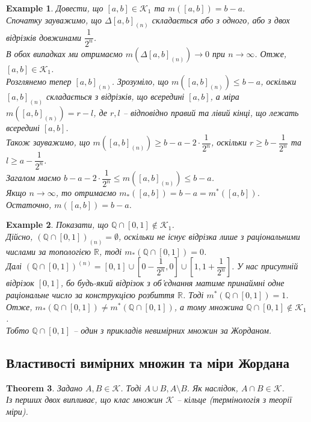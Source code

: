 \documentclass[a4paper, 10pt]{article}
\theoremstyle{theoremdd}
\newtheorem{theorem}{Theorem}[subsection]
\theoremstyle{theoremdd}
\theoremstyle{theoremdd}
\theoremstyle{theoremdd}
\theoremstyle{theoremdd}
\newtheorem{example}[theorem]{Example}
\theoremstyle{theoremdd}
\theoremstyle{theoremdd}
\theoremstyle{theoremdd}
\theoremstyle{theoremdd}
\theoremstyle{theoremdd}
\theoremstyle{theoremdd}
\theoremstyle{theoremdd}
\theoremstyle{theoremdd}
\theoremstyle{theoremdd}
\theoremstyle{theoremdd}
\begin{document}
\begin{example}
Довести, що $[a,b] \in \mathcal{K}_1$ та $m([a,b]) = b-a$.\\
Спочатку зауважимо, що $\Delta [a,b]_{(n)}$ складається або з одного, або з двох відрізків довжинами $\dfrac{1}{2^n}$.\\
В обох випадках ми отримаємо $m(\Delta [a,b]_{(n)}) \to 0$ при $n \to \infty$. Отже, $[a,b] \in \mathcal{K}_1$.\\
Розглянемо тепер $[a,b]_{(n)}$. Зрозуміло, що $m([a,b]_{(n)}) \leq b-a$, оскільки $[a,b]_{(n)}$ складається з відрізків, що всередині $[a,b]$, а міра $m([a,b]_{(n)}) = r - l$, де $r,l$ -- відповідно правий та лівий кінці, що лежать всередині $[a,b]$.\\
Також зауважимо, що $m([a,b]_{(n)}) \geq b-a -2 \cdot \dfrac{1}{2^n}$, оскільки $r \geq b- \dfrac{1}{2^n}$ та $l \geq a- \dfrac{1}{2^n}$.\\
Загалом маємо $b-a- 2 \cdot \dfrac{1}{2^n} \leq m([a,b]_{(n)}) \leq b-a$.\\
Якщо $n \to \infty$, то отримаємо $m_*([a,b]) = b-a = m^*([a,b])$.\\
Остаточно, $m([a,b]) = b-a$.
\end{example}

\begin{example}
Показати, що $\mathbb{Q} \cap [0,1] \not\in \mathcal{K}_1$.\\
Дійсно, $\left(\mathbb{Q} \cap [0,1] \right)_{(n)} = \emptyset$, оскільки не існує відрізка лише з раціональними числами за топологією $\mathbb{R}$, тоді $m_*(\mathbb{Q} \cap [0,1]) = 0$.\\
Далі $\left( \mathbb{Q} \cap [0,1] \right)^{(n)} = [0,1] \cup \left[ 0 - \dfrac{1}{2^n}, 0 \right] \cup \left[ 1, 1 + \dfrac{1}{2^n} \right]$. У нас присутній відрізок $[0,1]$, бо будь-який відрізок з об'єднання матиме принаймні одне раціональне число за конструкцією розбиття $\mathbb{R}$. Тоді $m^*(\mathbb{Q} \cap [0,1]) = 1$.\\
Отже, $m_*(\mathbb{Q} \cap [0,1]) \neq m^*(\mathbb{Q} \cap [0,1])$, а тому множина $\mathbb{Q} \cap [0,1] \not\in \mathcal{K}_1$.\\
Тобто $\mathbb{Q} \cap [0,1]$ -- один з прикладів невимірних множин за Жорданом.
\end{example}

\subsection{Властивості вимірних множин та міри Жордана}
\begin{theorem}
Задано $A,B \in \mathcal{K}$. Тоді $A \cup B, A \setminus B$. Як наслідок, $A \cap B \in \mathcal{K}$.\\
Із перших двох випливає, що клас множин $\mathcal{K}$ -- кільце (термінологія з теорії міри).
\end{theorem}
\end{document}
